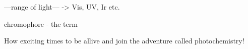 ---range of light--- -> Vis, UV, Ir etc.

chromophore - the term

How exciting times to be allive and join the adventure called photochemistry!